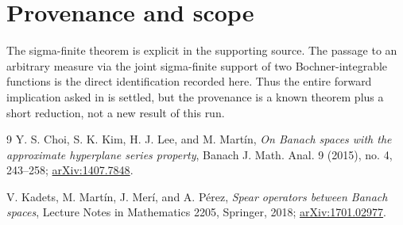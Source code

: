 \documentclass[11pt]{article}
\begin{document}
\section*{Provenance and scope}

The sigma-finite theorem is explicit in the supporting source.  The
passage to an arbitrary measure via the joint sigma-finite support of
two Bochner-integrable functions is the direct identification recorded
here.  Thus the entire forward implication asked in \cite{CKLM} is
settled, but the provenance is a known theorem plus a short reduction,
not a new result of this run.

\begin{thebibliography}{9}
Y. S. Choi, S. K. Kim, H. J. Lee, and M. Mart\'in,
\emph{On Banach spaces with the approximate hyperplane series property},
Banach J. Math. Anal. 9 (2015), no. 4, 243--258;
\href{https://arxiv.org/abs/1407.7848}{arXiv:1407.7848}.

V. Kadets, M. Mart\'in, J. Mer\'i, and A. P\'erez,
\emph{Spear operators between Banach spaces},
Lecture Notes in Mathematics 2205, Springer, 2018;
\href{https://arxiv.org/abs/1701.02977}{arXiv:1701.02977}.
\end{thebibliography}
\end{document}
